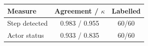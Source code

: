 \begin{tabular}{lcc}
\toprule
Measure & Agreement / $\kappa$ & Labelled \\
\midrule
Step detected & 0.983 / 0.955 & 60/60 \\
Actor status & 0.933 / 0.835 & 60/60 \\
\bottomrule
\end{tabular}
